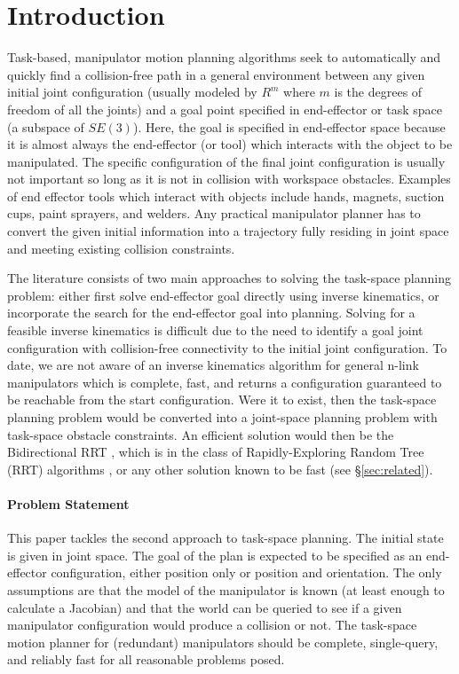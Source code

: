 \documentclass[conference]{IEEEtran}
\begin{document}
\section{Introduction}
Task-based, manipulator motion planning algorithms seek to automatically and
quickly find a collision-free path in a general environment between any
given initial joint configuration (usually modeled by $R^m$ where $m$ is the
degrees of freedom of all the joints) and a goal point specified in 
end-effector or task space (a subspace of $SE(3)$).  Here, the goal is
specified in end-effector space because it is almost always the end-effector
(or tool) which interacts with the object to be manipulated. The specific
configuration of the final joint configuration is usually not important so
long as it is not in collision with workspace obstacles.  Examples of end
effector tools which interact with objects include hands, magnets, suction
cups, paint sprayers, and welders. Any practical manipulator planner has to
convert the given initial information into a trajectory fully residing in
joint space and meeting existing collision constraints.

The literature consists of two main approaches to solving the task-space
planning problem: either first solve end-effector goal directly using
inverse kinematics, or incorporate the search for the end-effector 
goal into planning.   Solving for a feasible inverse kinematics is difficult
due to the need to identify a goal joint configuration with collision-free
connectivity to the initial joint configuration.  To date, we are not
aware of an inverse kinematics algorithm for general n-link manipulators
which is complete, fast, and returns a configuration guaranteed to be
reachable from the start configuration.  Were it to exist, then the
task-space planning problem would be converted into a joint-space planning
problem with task-space obstacle constraints.  An efficient solution would
then be the Bidirectional RRT \CITE, which is in the class of
Rapidly-Exploring Random Tree (RRT) algorithms \CITE, or any other solution
known to be fast (see \S \ref{sec:related}).

\paragraph{Problem Statement}
This paper tackles the second approach to task-space planning.  The initial
state is given in joint space.  The goal of the plan is expected to be 
specified as an end-effector configuration, either position only or position 
and orientation. The only assumptions are that the model of the manipulator
is known (at least enough to calculate a Jacobian) and that the world can be
queried to see if a given manipulator configuration would produce a
collision or not.  The task-space motion planner for (redundant) manipulators 
should be complete, single-query, and reliably fast for all reasonable
problems posed. 
\end{document}
